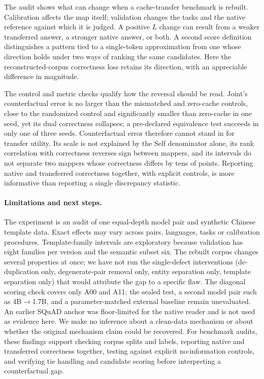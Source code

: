 \documentclass[10pt]{article}
\begin{document}
The audit shows what can change when a cache-transfer benchmark is rebuilt. Calibration affects the map itself; validation changes the tasks and the native reference against which it is judged. A positive $L$ change can result from a weaker transferred answer, a stronger native answer, or both. A second score definition distinguishes a pattern tied to a single-token approximation from one whose direction holds under two ways of ranking the same candidates. Here the reconstructed-corpus correctness loss retains its direction, with an appreciable difference in magnitude.

The control and metric checks qualify how the reversal should be read. Joint's counterfactual error is no larger than the mismatched and zero-cache controls, close to the randomized control and significantly smaller than zero-cache in one seed, yet its dual correctness collapses; a pre-declared equivalence test succeeds in only one of three seeds. Counterfactual error therefore cannot stand in for transfer utility. Its scale is not explained by the Self denominator alone, its rank correlation with correctness reverses sign between mappers, and its intervals do not separate two mappers whose correctness differs by tens of points. Reporting native and transferred correctness together, with explicit controls, is more informative than reporting a single discrepancy statistic.

\paragraph{Limitations and next steps.}
The experiment is an audit of one equal-depth model pair and synthetic Chinese template data. Exact effects may vary across pairs, languages, tasks or calibration procedures. Template-family intervals are exploratory because validation has eight families per version and the semantic subset six. The rebuilt corpus changes several properties at once; we have not run the single-defect interventions (de-duplication only, degenerate-pair removal only, entity separation only, template separation only) that would attribute the gap to a specific flaw. The diagonal scoring check covers only A00 and A11; the sealed test, a second model pair such as 4B$\to$1.7B, and a parameter-matched external baseline remain unevaluated. An earlier SQuAD anchor was floor-limited for the native reader and is not used as evidence here. We make no inference about a clean-data mechanism or about whether the original mechanism claim could be recovered. For benchmark audits, these findings support checking corpus splits and labels, reporting native and transferred correctness together, testing against explicit no-information controls, and verifying tie handling and candidate scoring before interpreting a counterfactual gap.
\end{document}
